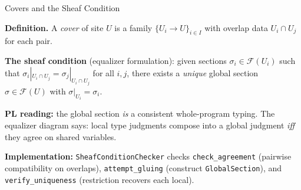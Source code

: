 \documentclass[aspectratio=169,11pt]{beamer}
\newcommand{\Sem}{\mathcal{F}}
\begin{document}
\begin{frame}{Covers and the Sheaf Condition}

\textbf{Definition.} A \emph{cover} of site $U$ is a family
$\{U_i \to U\}_{i \in I}$ with overlap data
$U_i \cap U_j$ for each pair.

\vspace{0.3em}
\textbf{The sheaf condition} (equalizer formulation):
given sections $\sigma_i \in \Sem(U_i)$ such that
$\sigma_i|_{U_i \cap U_j} = \sigma_j|_{U_i \cap U_j}$
for all $i, j$, there exists a \emph{unique} global section
$\sigma \in \Sem(U)$ with $\sigma|_{U_i} = \sigma_i$.

\vspace{0.3em}
\begin{center}
\end{center}

\vspace{0.2em}
\textbf{PL reading:} the global section \emph{is} a consistent whole-program typing.
The equalizer diagram says: local type judgments compose into a global judgment
\emph{iff} they agree on shared variables.

\vspace{0.3em}
{\small \textbf{Implementation:} \texttt{SheafConditionChecker} checks
\texttt{check\_agreement} (pairwise compatibility on overlaps),
\texttt{attempt\_gluing} (construct \texttt{GlobalSection}),
and \texttt{verify\_uniqueness} (restriction recovers each local).}

\end{frame}
\end{document}
